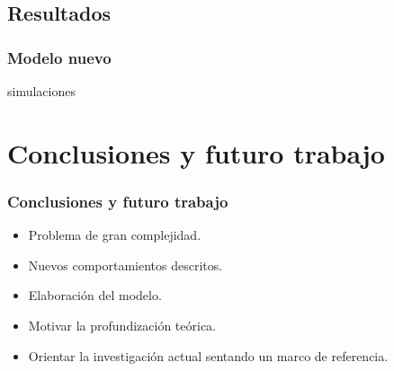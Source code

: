 \documentclass{beamer}
\begin{document}
\subsection{Resultados}

\begin{frame}
\frametitle{Modelo nuevo}
simulaciones
\end{frame}

\section{Conclusiones y futuro trabajo}

\begin{frame}
	\frametitle{Conclusiones y futuro trabajo}
	
	\begin{itemize}
		\item Problema de gran complejidad.
		\item Nuevos comportamientos descritos.
		\item Elaboración del modelo. 
		\item Motivar la profundización teórica.
		\item Orientar la investigación actual sentando un marco de referencia.
	\end{itemize}
\end{frame}
\end{document}
